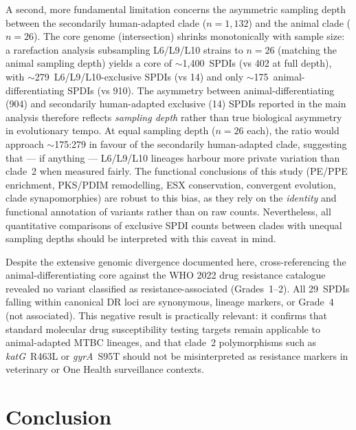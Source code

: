 \documentclass[11pt,a4paper]{article}
\begin{document}
A second, more fundamental limitation concerns the asymmetric sampling depth
between the secondarily human-adapted clade ($n = 1{,}132$) and the animal
clade ($n = 26$).
%
The core genome (intersection) shrinks monotonically with sample size: a
rarefaction analysis subsampling L6/L9/L10 strains to $n = 26$ (matching the
animal sampling depth) yields a core of $\sim$1{,}400~SPDIs (vs 402 at full
depth), with $\sim$279~L6/L9/L10-exclusive SPDIs (vs 14) and only
$\sim$175~animal-differentiating SPDIs (vs 910).
%
The asymmetry between animal-differentiating (904) and secondarily human-adapted
exclusive (14) SPDIs reported in the main analysis therefore reflects
\emph{sampling depth} rather than true biological asymmetry in evolutionary
tempo.
%
At equal sampling depth ($n = 26$ each), the ratio would approach
$\sim$175:279 in favour of the secondarily human-adapted clade, suggesting
that --- if anything --- L6/L9/L10 lineages harbour more private variation
than clade~2 when measured fairly.
%
The functional conclusions of this study (PE/PPE enrichment, PKS/PDIM
remodelling, ESX conservation, convergent evolution, clade synapomorphies) are
robust to this bias, as they rely on the \emph{identity} and functional
annotation of variants rather than on raw counts. Nevertheless, all
quantitative comparisons of exclusive SPDI counts between clades with
unequal sampling depths should be interpreted with this caveat in mind.

Despite the extensive genomic divergence documented here, cross-referencing
the animal-differentiating core against the WHO 2022 drug resistance catalogue
revealed no variant classified as resistance-associated (Grades~1--2).
All 29~SPDIs falling within canonical DR loci are synonymous, lineage
markers, or Grade~4 (not associated). This negative result is
practically relevant: it confirms that standard molecular drug
susceptibility testing targets remain applicable to animal-adapted
MTBC lineages, and that clade~2 polymorphisms such as
\textit{katG}~R463L or \textit{gyrA}~S95T should not be misinterpreted
as resistance markers in veterinary or One Health surveillance contexts.

\section{Conclusion}
\label{sec:conclusion}
\end{document}
